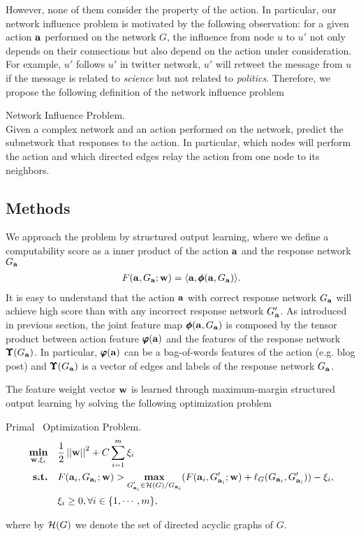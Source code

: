 {However, none of them consider the property of the action.
In particular, our network influence problem is motivated by the following observation: for a given action $\mathbf {a}$ performed on the network $G$, the influence from node $u$ to $u'$ not only depends on their connections but also depend on the action under consideration.
For example, $u'$ follows $u'$ in twitter network, $u'$ will retweet the message from $u$ if the message is related to \textit{science} but not related to \textit{politics}.
Therefore, we propose the following definition of the network influence problem
\begin{definition}{Network Influence Problem.}\\
	Given a complex network and an action performed on the network, predict the subnetwork that responses to the action. In particular, which nodes will perform the action and which directed edges relay the action from one node to its neighbors.
\end{definition}

%
\subsection{Methods}
We approach the problem by structured output learning, where we define a computability score as a inner product of the action $\mathbf {a}$ and the response network $G_{\mathbf {a}}$
\begin{align*}
	F(\mathbf {a},G_{\mathbf {a}};\mathbf {w}) = \langle \mathbf {a}, \pmb \phi(\mathbf {a},G_{\mathbf {a}}) \rangle.
\end{align*}
It is easy to understand that the action $\mathbf {a}$ with correct response network $G_{\mathbf {a}}$ will achieve high score than with any incorrect response network $G_{\mathbf {a}}'$.
As introduced in previous section, the joint feature map $\pmb \phi(\mathbf {a},G_{\mathbf {a}})$ is composed by the tensor product between action feature $\pmb \varphi(\mathbf {a})$ and the features of the response network $\pmb \Upsilon(G_{\mathbf {a}})$.
In particular, $\pmb \varphi(\mathbf {a})$ can be a bag-of-words features of the action (e.g. blog post) and $\pmb \Upsilon(G_{\mathbf {a}})$ is a vector of edges and labels of the response network $G_{\mathbf {a}}$.

The feature weight vector $\mathbf {w}$ is learned through maximum-margin structured output learning by solving the following optimization problem
\begin{definition}{Primal \spin\ Optimization Problem.}
\begin{align*}
	\underset{\mathbf {w},\mathbf{\xi}_i}{\textbf{min}} &\quad \frac{1}{2}\left|\left| \mathbf {w} \right|\right|^2+C\sum_{i=1}^{m}\xi_i\\
	\textbf{s.t.} &\quad F(\mathbf {a}_i,G_{\mathbf {a}_i};\mathbf {w}) > \underset{\substack{G_{\mathbf {a}_i}'\in\mathcal{H}(G)/G_{\mathbf {a}_i}}}{\textbf{max}}(F(\mathbf {a}_i,G_{\mathbf {a}_i}';\mathbf {w})+\mathbf {\ell}_{G}(G_{\mathbf {a}_i},G_{\mathbf {a}_i}')) - \xi_i,\\
	&\quad \xi_i\ge0, \forall i\in\{1,\cdots,m\},
\end{align*}
\end{definition}
where by $\mathcal{H}(G)$ we denote the set of directed acyclic graphs of $G$.

}
